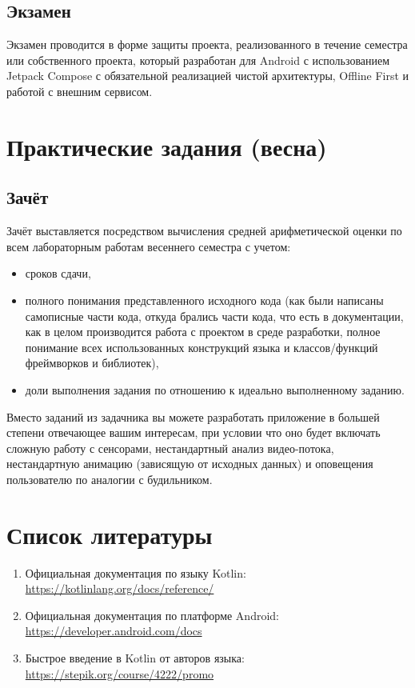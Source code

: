 \documentclass{article}
\begin{document}
\subsection{Экзамен}

Экзамен проводится в форме защиты проекта, реализованного в течение семестра или собственного проекта, который разработан для
Android с использованием Jetpack Compose с обязательной реализацией чистой архитектуры, Offline First и работой с внешним сервисом.

\section{Практические задания (весна)}









\subsection{Зачёт}

Зачёт выставляется посредством вычисления средней арифметической оценки по всем лабораторным работам весеннего семестра с учетом:
\begin{itemize}
    \item сроков сдачи,
    \item полного понимания представленного исходного кода (как были написаны самописные части кода, откуда брались части кода,
    что есть в документации, как в целом производится работа с проектом в среде разработки, полное понимание всех использованных
    конструкций языка и классов/функций фреймворков и библиотек),
    \item доли выполнения задания по отношению к идеально выполненному заданию.
\end{itemize}

Вместо заданий из задачника вы можете разработать приложение в большей степени отвечающее вашим интересам, при условии
что оно будет включать сложную работу с сенсорами, нестандартный анализ видео-потока, нестандартную анимацию (зависящую
от исходных данных) и оповещения пользователю по аналогии с будильником.

\section{Список литературы}

\begin{enumerate}
    \item Официальная документация по языку Kotlin: \url{https://kotlinlang.org/docs/reference/}
    \item Официальная документация по платформе Android: \url{https://developer.android.com/docs}
    \item Быстрое введение в Kotlin от авторов языка: \url{https://stepik.org/course/4222/promo}
\end{enumerate}
\end{document}
